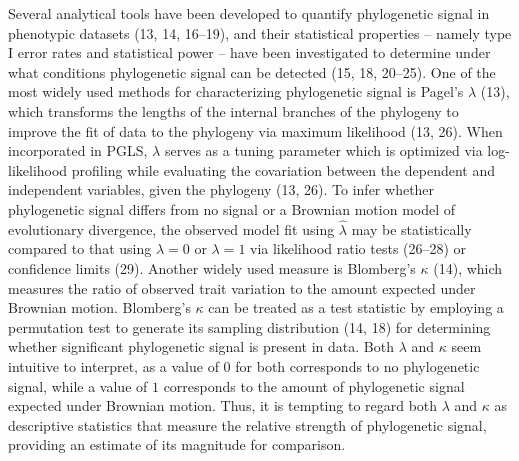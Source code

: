 \documentclass[9pt,twocolumn,twoside,lineno]{pnas-new}
\begin{document}
Several analytical tools have been developed to quantify phylogenetic
signal in phenotypic datasets (13, 14, 16--19), and their statistical
properties -- namely type I error rates and statistical power -- have
been investigated to determine under what conditions phylogenetic signal
can be detected (15, 18, 20--25). One of the most widely used methods
for characterizing phylogenetic signal is Pagel's \(\lambda\) (13),
which transforms the lengths of the internal branches of the phylogeny
to improve the fit of data to the phylogeny via maximum likelihood (13,
26). When incorporated in PGLS, \(\lambda\) serves as a tuning parameter
which is optimized via log-likelihood profiling while evaluating the
covariation between the dependent and independent variables, given the
phylogeny (13, 26). To infer whether phylogenetic signal differs from no
signal or a Brownian motion model of evolutionary divergence, the
observed model fit using \(\hat\lambda\) may be statistically compared
to that using \(\lambda=0\) or \(\lambda=1\) via likelihood ratio tests
(26--28) or confidence limits (29). Another widely used measure is
Blomberg's \(\kappa\) (14), which measures the ratio of observed trait
variation to the amount expected under Brownian motion. Blomberg's
\(\kappa\) can be treated as a test statistic by employing a permutation
test to generate its sampling distribution (14, 18) for determining
whether significant phylogenetic signal is present in data. Both
\(\lambda\) and \(\kappa\) seem intuitive to interpret, as a value of
\(0\) for both corresponds to no phylogenetic signal, while a value of
\(1\) corresponds to the amount of phylogenetic signal expected under
Brownian motion. Thus, it is tempting to regard both \(\lambda\) and
\(\kappa\) as descriptive statistics that measure the relative strength
of phylogenetic signal, providing an estimate of its magnitude for
comparison.
\end{document}
